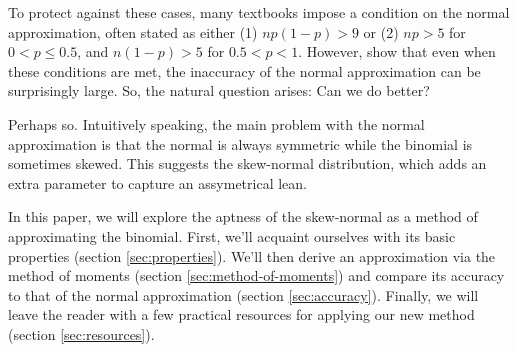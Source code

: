 To protect against these cases, many textbooks impose a condition on the normal
approximation, often stated as either (1) $np(1-p) > 9$ \; or \; (2) $np > 5$
for $0 < p \leq 0.5$, and $n(1-p) > 5$ for $0.5 < p < 1$. However, \citet{mabs}
show that even when these conditions are met, the inaccuracy of the normal
approximation can be surprisingly large. So, the natural question arises: Can
we do better?

Perhaps so. Intuitively speaking, the main problem with the normal
approximation is that the normal is always symmetric while the binomial is
sometimes skewed. This suggests the skew-normal distribution, which adds an
extra parameter to capture an assymetrical lean.

In this paper, we will explore the aptness of the skew-normal as a method of
approximating the binomial. First, we'll acquaint ourselves with its basic
properties (section \ref{sec:properties}). We'll then derive an approximation
via the method of moments (section \ref{sec:method-of-moments}) and compare its
accuracy to that of the normal approximation (section \ref{sec:accuracy}).
Finally, we will leave the reader with a few practical resources for applying
our new method (section \ref{sec:resources}).
